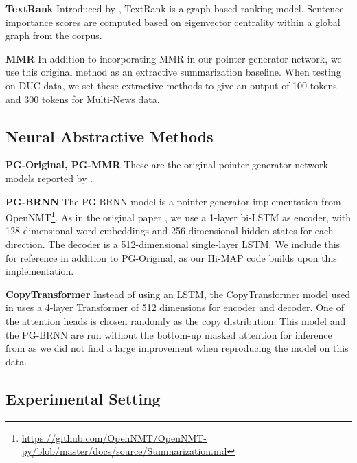 \documentclass[11pt,a4paper]{article}
\begin{document}
\noindent\textbf{TextRank} Introduced by \cite{mihalcea2004textrank}, TextRank is a graph-based ranking model.  Sentence importance scores are computed based on eigenvector centrality within a global graph from the corpus.


\noindent\textbf{MMR} In addition to incorporating MMR in our pointer generator network, we use this original method as an extractive summarization baseline.
When testing on DUC data, we set these extractive methods to give an output of 100 tokens and 300 tokens for Multi-News data.
\subsection{Neural Abstractive Methods}
\textbf{PG-Original, PG-MMR} These are the original pointer-generator network models reported by \cite{lebanoff18mds}.

\noindent\textbf{PG-BRNN} The PG-BRNN model is a pointer-generator implementation from OpenNMT\footnote{\url{https://github.com/OpenNMT/OpenNMT-py/blob/master/docs/source/Summarization.md}}. As in the original paper \cite{see2017ptr_gen}, we use a 1-layer bi-LSTM as encoder, with 128-dimensional word-embeddings and 256-dimensional hidden states for each direction. The decoder is a 512-dimensional single-layer LSTM. We include this for reference in addition to PG-Original, as our Hi-MAP code builds upon this implementation. 

\noindent\textbf{CopyTransformer} Instead of using an LSTM, the CopyTransformer model used in  uses a 4-layer Transformer of 512 dimensions for encoder and decoder.  One of the attention heads is chosen randomly as the copy distribution. This model and the PG-BRNN are run without the bottom-up masked attention for inference from  as we did not find a large improvement when reproducing the model on this data. 

\subsection{Experimental Setting}
\end{document}
